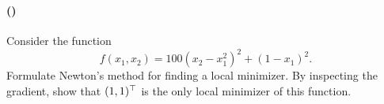 \documentclass{article}
\newcounter{problems}
\renewcommand{\problem}[1]{\paragraph{(\theproblems)}\addtocounter{problems}{1}\label{#1}}
\newcommand{\marks}[2][0mm]{\hspace{30mm}\mbox{}\vskip #1\hspace{-30mm}\hfill{\sf [#2 marks]}\\[-\baselineskip]}
\renewcommand{\marks}[2][0mm]{\hspace{30mm}\mbox{}\vskip #1\hspace{-30mm}\hfill{\sf [#2 marks]}\\[-\baselineskip]}
\begin{document}
\marks[-6mm]{4} 

\newpage
\mbox{}
\newpage

\problem{p4} Consider the function
\begin{equation*}
 f(x_1,x_2) = 100(x_2-x_1^2)^2+(1-x_1)^2.
\end{equation*}
Formulate Newton's method for finding a local minimizer. By inspecting the gradient, show that $(1,1)^{\top}$ is the only local minimizer of this function.
\marks[-4mm]{4}

\newpage
\mbox{}
\newpage
 
\end{document}
